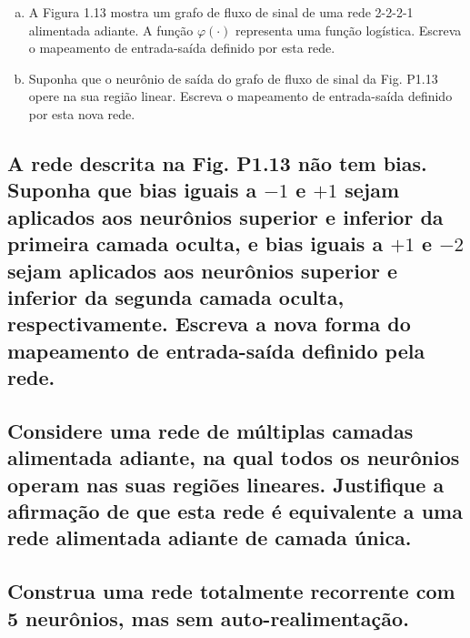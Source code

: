 \documentclass[12pt, openright, a4paper, twoside, english, brazil]{article}
\begin{document}
\begin{enumerate}[(a)]
\item A Figura 1.13 mostra um grafo de fluxo de sinal de uma rede
  2-2-2-1 alimentada adiante. A função $\varphi(\cdot)$ representa
  uma função logística. Escreva o mapeamento de entrada-saída
  definido por esta rede.
\item Suponha que o neurônio de saída do grafo de fluxo de sinal da
  Fig. P1.13 opere na sua região linear. Escreva o mapeamento de
  entrada-saída definido por esta nova rede.
\end{enumerate}

\subsection{A rede descrita na Fig. P1.13 não tem bias. Suponha que
bias iguais a $-1$ e $+1$ sejam aplicados aos neurônios superior e
inferior da primeira camada oculta, e bias iguais a $+1$ e $-2$ sejam
aplicados aos neurônios superior e inferior da segunda camada oculta,
respectivamente. Escreva a nova forma do mapeamento de entrada-saída
definido pela rede.}

\subsection{Considere uma rede de múltiplas camadas alimentada
adiante, na qual todos os neurônios operam nas suas regiões lineares.
Justifique a afirmação de que esta rede é equivalente a uma rede
alimentada adiante de camada única.}

\subsection{Construa uma rede totalmente recorrente com 5 neurônios,
mas sem auto-realimentação.}
\end{document}
